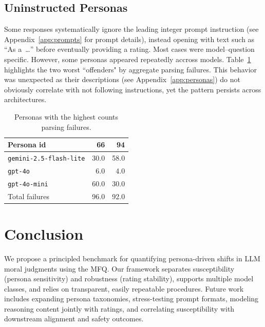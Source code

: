 \documentclass{article}
\begin{document}
\subsection{Uninstructed Personas}
\label{sec:unistructed_personas}

Some responses systematically ignore the leading integer prompt instruction (see Appendix~\ref{app:prompts} for prompt details), instead opening with text such as ``As a~\ldots'' before eventually providing a rating. Most cases were model--question specific. However, some personas appeared repeatedly accross models. Table~\ref{tab:uninstructed-personas} highlights the two worst ``offenders" by aggregate parsing failures. This behavior was unexpected as their descriptions (see Appendix~\ref{app:personas}) do not obviously correlate with not following instructions, yet the pattern persists across architectures.

\begin{table}[t]
  \centering
  \caption{Personas with the highest counts parsing failures.}
  \label{tab:uninstructed-personas}
  \begin{tabular}{lrr}
    \toprule
    Persona id & 66 & 94 \\
    \midrule
    \texttt{gemini-2.5-flash-lite} & 30.0 & 58.0 \\
    \texttt{gpt-4o} & 6.0 & 4.0\\
    \texttt{gpt-4o-mini} & 60.0 & 30.0\\
    \midrule
    Total failures & 96.0 & 92.0\\
    \bottomrule
  \end{tabular}
\end{table}


\section{Conclusion}
We propose a principled benchmark for quantifying persona-driven shifts in LLM moral judgments using the MFQ. Our framework separates susceptibility (persona sensitivity) and robustness (rating stability), supports multiple model classes, and relies on transparent, easily repeatable procedures. Future work includes expanding persona taxonomies, stress-testing prompt formats, modeling reasoning content jointly with ratings, and correlating susceptibility with downstream alignment and safety outcomes.





\end{document}
